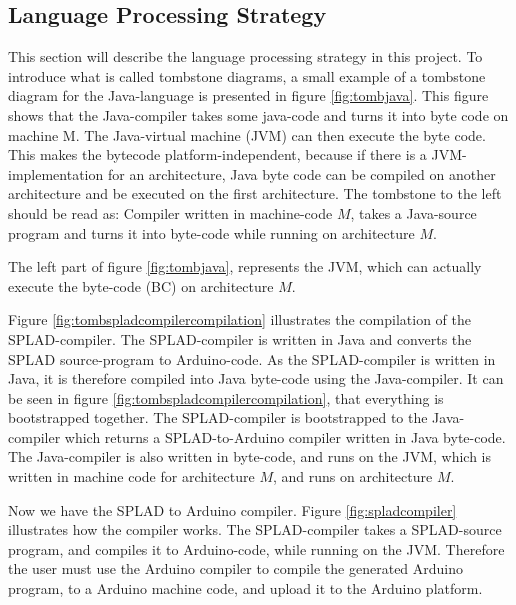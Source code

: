 \subsection{Language Processing Strategy}
\label{sec:LanguageProcessingStrategy}
This section will describe the language processing strategy in this project. To introduce what is called tombstone diagrams, a small example of a tombstone diagram for the Java-language is presented in figure \ref{fig:tombjava}. This figure shows that the Java-compiler takes some java-code and turns it into byte code on machine M. The Java-virtual machine (JVM) can then execute the byte code. This makes the bytecode platform-independent, because if there is a JVM-implementation for an architecture, Java byte code can be compiled on another architecture and be executed on the first architecture. The tombstone to the left should be read as: Compiler written in machine-code $M$, takes a Java-source program and turns it into byte-code while running on architecture $M$.


The left part of figure \ref{fig:tombjava}, represents the JVM, which can actually execute the byte-code (BC) on architecture $M$.

Figure \ref{fig:tombspladcompilercompilation} illustrates the compilation of the SPLAD-compiler. The SPLAD-compiler is written in Java and converts the SPLAD source-program to Arduino-code. As the SPLAD-compiler is written in Java, it is therefore compiled into Java byte-code using the Java-compiler. It can be seen in figure \ref{fig:tombspladcompilercompilation}, that everything is bootstrapped together. The SPLAD-compiler is bootstrapped to the Java-compiler which returns a SPLAD-to-Arduino compiler written in Java byte-code. The Java-compiler is also written in byte-code, and runs on the JVM, which is written in machine code for architecture $M$, and runs on architecture $M$.

Now we have the SPLAD to Arduino compiler. Figure \ref{fig:spladcompiler} illustrates how the compiler works. The SPLAD-compiler takes a SPLAD-source program, and compiles it to Arduino-code, while running on the JVM. Therefore the user must use the Arduino compiler to compile the generated Arduino program, to a Arduino machine code, and upload it to the Arduino platform. 
